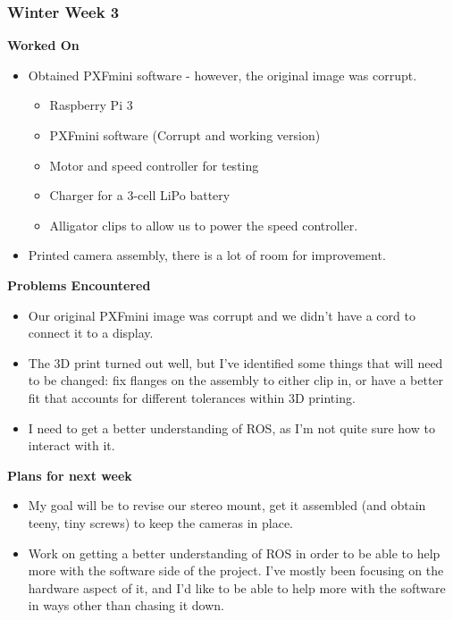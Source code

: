 \documentclass[compsoc,draftclsnofoot,onecolumn,10pt]{IEEEtran}
\begin{document}
\subsubsection*{Winter Week 3}
\textbf{Worked On}
\begin{itemize}
    \item Obtained PXFmini software - however, the original image was corrupt.
    \begin{itemize}
        \item Raspberry Pi 3
        \item PXFmini software (Corrupt and working version)
        \item Motor and speed controller for testing
        \item Charger for a 3-cell LiPo battery
        \item Alligator clips to allow us to power the speed controller.
    \end{itemize}
    \item Printed camera assembly, there is a lot of room for improvement.
\end{itemize}
\textbf{Problems Encountered}
\begin{itemize}
    \item Our original PXFmini image was corrupt and we didn't have a cord to connect it to a display.
    \item The 3D print turned out well, but I've identified some things that will need to be changed: fix flanges on the assembly to either clip in, or have a better fit that accounts for different tolerances within 3D printing. 
    \item I need to get a better understanding of ROS, as I'm not quite sure how to interact with it.
\end{itemize}
\textbf{Plans for next week}
\begin{itemize}
    \item My goal will be to revise our stereo mount, get it assembled (and obtain teeny, tiny screws) to keep the cameras in place.
    \item Work on getting a better understanding of ROS in order to be able to help more with the software side of the project. I've mostly been focusing on the hardware aspect of it, and I'd like to be able to help more with the software in ways other than chasing it down.
\end{itemize}
\end{document}
